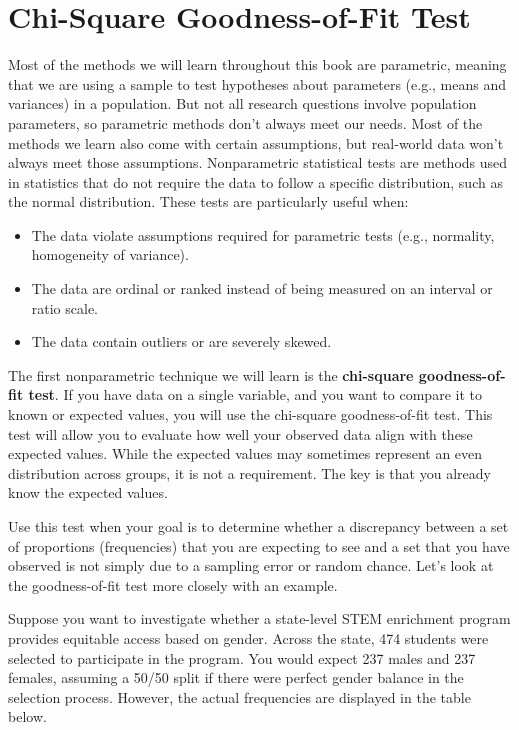 \documentclass[
  letterpaper,
  DIV=11,
  numbers=noendperiod]{scrreprt}
\begin{document}
\section{Chi-Square Goodness-of-Fit
Test}\label{chi-square-goodness-of-fit-test}

Most of the methods we will learn throughout this book are parametric,
meaning that we are using a sample to test hypotheses about parameters
(e.g., means and variances) in a population. But not all research
questions involve population parameters, so parametric methods don't
always meet our needs. Most of the methods we learn also come with
certain assumptions, but real-world data won't always meet those
assumptions. Nonparametric statistical tests are methods used in
statistics that do not require the data to follow a specific
distribution, such as the normal distribution. These tests are
particularly useful when:

\begin{itemize}
\item
  The data violate assumptions required for parametric tests (e.g.,
  normality, homogeneity of variance).
\item
  The data are ordinal or ranked instead of being measured on an
  interval or ratio scale.
\item
  The data contain outliers or are severely skewed.
\end{itemize}

The first nonparametric technique we will learn is the
\textbf{chi-square goodness-of-fit test}. If you have data on a single
variable, and you want to compare it to known or expected values, you
will use the chi-square goodness-of-fit test. This test will allow you
to evaluate how well your observed data align with these expected
values. While the expected values may sometimes represent an even
distribution across groups, it is not a requirement. The key is that you
already know the expected values.

Use this test when your goal is to determine whether a discrepancy
between a set of proportions (frequencies) that you are expecting to see
and a set that you have observed is not simply due to a sampling error
or random chance. Let's look at the goodness-of-fit test more closely
with an example.

Suppose you want to investigate whether a state-level STEM enrichment
program provides equitable access based on gender. Across the state, 474
students were selected to participate in the program. You would expect
237 males and 237 females, assuming a 50/50 split if there were perfect
gender balance in the selection process. However, the actual frequencies
are displayed in the table below.
\end{document}

